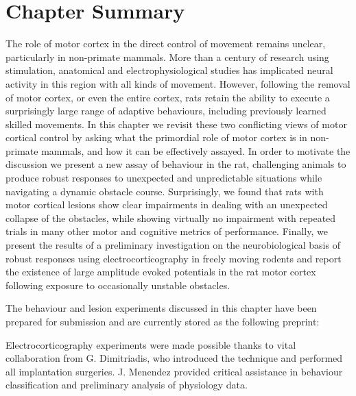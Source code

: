 				
\section{Chapter Summary}

The role of motor cortex in the direct control of movement remains unclear, particularly in non-primate mammals. More than a century of research using stimulation, anatomical and electrophysiological studies has implicated neural activity in this region with all kinds of movement. However, following the removal of motor cortex, or even the entire cortex, rats retain the ability to execute a surprisingly large range of adaptive behaviours, including previously learned skilled movements. In this chapter we revisit these two conflicting views of motor cortical control by asking what the primordial role of motor cortex is in non-primate mammals, and how it can be effectively assayed. In order to motivate the discussion we present a new assay of behaviour in the rat, challenging animals to produce robust responses to unexpected and unpredictable situations while navigating a dynamic obstacle course. Surprisingly, we found that rats with motor cortical lesions show clear impairments in dealing with an unexpected collapse of the obstacles, while showing virtually no impairment with repeated trials in many other motor and cognitive metrics of performance. Finally, we present the results of a preliminary investigation on the neurobiological basis of robust responses using electrocorticography in freely moving rodents and report the existence of large amplitude evoked potentials in the rat motor cortex following exposure to occasionally unstable obstacles.

\bigskip
The behaviour and lesion experiments discussed in this chapter have been prepared for submission and are currently stored as the following preprint:

Electrocorticography experiments were made possible thanks to vital collaboration from G. Dimitriadis, who introduced the technique and performed all implantation surgeries. J. Menendez provided critical assistance in behaviour classification and preliminary analysis of physiology data.

\pagebreak


